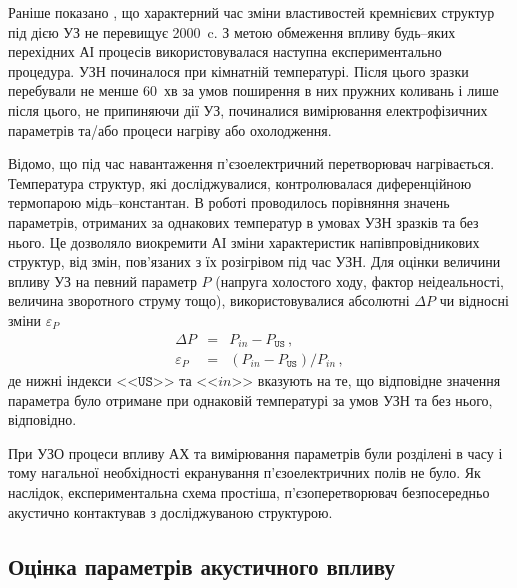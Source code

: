 Раніше показано \cite{Ostapenko1995,YOlikhTPL2011,Ostrovskii2001}, що характерний час зміни властивостей кремнієвих структур під дією УЗ не перевищує 2000~c.
З метою обмеження впливу будь--яких перехідних АІ процесів використовувалася наступна експериментально процедура.
УЗН починалося при кімнатній температурі.
Після цього зразки перебували не менше 60~хв за умов поширення в них пружних коливань і лише після цього, не припиняючи дії УЗ, починалися вимірювання електрофізичних параметрів та/або процеси нагріву або охолодження.


Відомо, що під час навантаження п'єзоелектричний перетворювач нагрівається.
Температура структур, які досліджувалися, контролювалася диференційною термопарою мідь--константан.
В роботі проводилось порівняння значень параметрів, отриманих за однакових температур в умовах УЗН зразків та без нього.
Це дозволяло виокремити АІ зміни характеристик напівпровідникових структур, від змін, пов'язаних з їх розігрівом під час УЗН.
Для оцінки величини впливу УЗ на певний параметр $P$ (напруга холостого ходу, фактор неідеальності, величина зворотного струму тощо),
використовувалися абсолютні
$\Delta P$ чи відносні зміни $\varepsilon_P$
\begin{eqnarray}
  \label{eqAbsDelta} \Delta P &=& P_{in}-P_\mathtt{US}\,, \\
  \label{eqEpsDelta} \varepsilon_P &=& (P_{in}-P_\mathtt{US})/P_{in}\,,
\end{eqnarray}
де нижні індекси <<$\mathtt{US}$>> та <<$in$>> вказують на те, що відповідне значення параметра було отримане при однаковій температурі за умов УЗН та без нього, відповідно.

При УЗО процеси впливу АХ та вимірювання параметрів були розділені в часу і тому нагальної необхідності екранування п'єзоелектричних полів не було.
Як наслідок, експериментальна схема простіша, п'єзоперетворювач безпосередньо акустично контактував з досліджуваною структурою.


\subsection{Оцінка параметрів акустичного впливу\label{SC:USL}}



